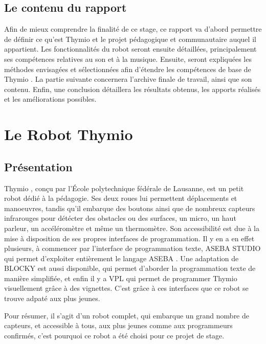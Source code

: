 \documentclass[a4paper, 12pt]{report}
\begin{document}
\section{Le contenu du rapport}
Afin de mieux comprendre la finalité de ce stage, ce rapport va d'abord permettre de définir ce qu'est Thymio \pageref{thymio} et le projet pédagogique et communautaire auquel il appartient. 
Les fonctionnalités du robot seront ensuite détaillées, principalement ses compétences relatives au son et à la musique. Ensuite, seront expliquées les méthodes envisagées et sélectionnées afin d'étendre les compétences de base de Thymio \pageref{thymio}. 
La partie suivante concernera l'archive finale de travail, ainsi que son contenu.
Enfin, une conclusion détaillera les résultats obtenus, les apports réalisés et les améliorations possibles.

\chapter{Le Robot Thymio}
\section{Présentation \cite{PresThymio} }
\label{thymio}

Thymio \pageref{thymio} , conçu par l’École polytechnique fédérale de Lausanne, est un petit robot dédié à la pédagogie. Ses deux roues lui permettent déplacements et manoeuvres, tandis qu'il embarque des boutons ainsi que de nombreux capteurs infrarouges pour détécter des obstacles ou des surfaces, un micro, un haut parleur, un accéléromètre et même un thermomètre. Son accessibilité est due à la mise à disposition de ses propres interfaces de programmation. Il y en a en effet plusieurs, à commencer par l'interface de programmation texte, ASEBA STUDIO qui permet d'exploiter entièrement le langage ASEBA \pageref{aseba} . Une adaptation de BLOCKY est aussi disponible, qui permet d'aborder la programmation texte de manière simplifiée, et enfin il y a VPL qui permet de programmer Thymio visuellement grâce à des vignettes. C'est grâce à ces interfaces que ce robot se trouve adpaté aux plus jeunes.

Pour résumer, il s'agit d'un robot complet, qui embarque un grand nombre de capteurs, et accessible à tous, aux plus jeunes comme aux programmeurs confirmés, c'est pourquoi ce robot a été choisi pour ce projet de stage.
\end{document}
